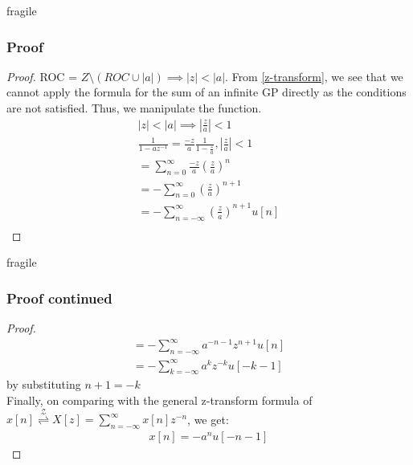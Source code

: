 \documentclass{beamer}
\providecommand{\brak}[1]{\ensuremath{\left(#1\right)}}
\providecommand{\ztrans}{\overset{\mathcal{Z}}{ \rightleftharpoons}}
\providecommand{\abs}[1]{\left\vert#1\right\vert}
\begin{document}
\begin{frame}{fragile}
\frametitle{Proof}

\begin{flushleft}
\begin{proof}
ROC =  $Z \setminus (ROC \cup \abs{a}) \implies \abs{z}  < \abs{a}$. From \eqref{z-transform}, we see that we cannot apply the formula for the sum of an infinite GP directly as the conditions are not satisfied. Thus, we manipulate the function.
\begin{align}
    \abs{z}  < \abs{a} \implies \abs{\frac{z}{a}} < 1\\
    \frac{1}{1 - az^{-1}} = \frac{-z}{a}\frac{1}{1 - \frac{z}{a}} , \abs{\frac{z}{a}} < 1\\
     = \sum_{n = 0}^\infty \frac{-z}{a} \brak{\frac{z}{a}}^n\\
     = - \sum_{n = 0}^\infty  \brak{\frac{z}{a}}^{n+1}\\
       = - \sum_{n = -\infty}^\infty  \brak{\frac{z}{a}}^{n+1}u[n]\\
\end{align}
\end{proof}
\end{flushleft}

\end{frame}
\begin{frame}{fragile}
\frametitle{Proof continued}

\begin{flushleft}
\begin{proof}
\begin{align}
    = -\sum_{n = -\infty}^\infty  a^{-n-1}z^{n+1}u[n]\\
      = -\sum_{k = -\infty}^\infty  a^{k}z^{-k}u[-k-1]
\end{align}
by substituting $n+1 = -k$\\
Finally, on comparing with the general z-transform formula of $x[n] \ztrans X[z] = \sum_{n = -\infty}^\infty x[n]z^{-n}$, we get:
\begin{align}
    x[n] = -a^nu[-n-1]
    \end{align}
\end{proof}
\end{flushleft}
\end{frame}
\end{document}
